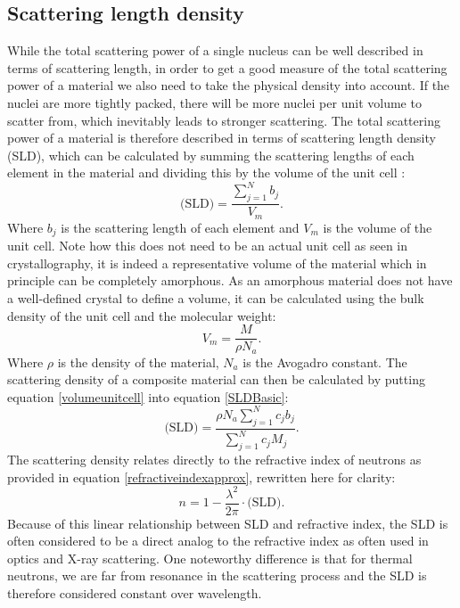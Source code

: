 \subsection{Scattering length density}\label{SLD}
While the total scattering power of a single nucleus can be well described in terms of scattering length, in order to get a good measure of the total scattering power of a material we also need to take the physical density into account. If the nuclei are more tightly packed, there will be more nuclei per unit volume to scatter from, which inevitably leads to stronger scattering. The total scattering power of a material is therefore described in terms of scattering length density (SLD), which can be calculated by summing the scattering lengths of each element in the material and dividing this by the volume of the unit cell \cite{neutronbookmatrac}:
\begin{equation}\label{SLDBasic}
	\textrm{(SLD)} = \frac{\sum_{j = 1}^{N} b_j}{V_m}.
\end{equation}
Where $b_j$ is the scattering length of each element and $V_m$ is the volume of the unit cell. Note how this does not need to be an actual unit cell as seen in crystallography, it is indeed a representative volume of the material which in principle can be completely amorphous. As an amorphous material does not have a well-defined crystal to define a volume, it can be calculated using the bulk density of the unit cell and the molecular weight: 
\begin{equation}\label{volumeunitcell}
	V_m = \frac{M}{\rho N_a}.
\end{equation}
Where $\rho$ is the density of the material, $N_a$ is the Avogadro constant. The scattering density of a composite material can then be calculated by putting equation \ref{volumeunitcell} into equation \ref{SLDBasic}:
\begin{equation}
	\textrm{(SLD)} = \frac{\rho N_a \sum_{j = 1}^{N}{c_j b_j}}{\sum_{j = 1}^{N} c_j M_j}.
\end{equation}
The scattering density relates directly to the refractive index of neutrons as provided in equation \ref{refractiveindexapprox}, rewritten here for clarity:
\begin{equation}
	n = 1 - \frac{\lambda^2}{2\pi} \cdot \textrm{(SLD)}.
\end{equation}
Because of this linear relationship between SLD and refractive index, the SLD is often considered to be a direct analog to the refractive index as often used in optics and X-ray scattering. One noteworthy difference is that for thermal neutrons, we are far from resonance in the scattering process and the SLD is therefore considered constant over wavelength. 
